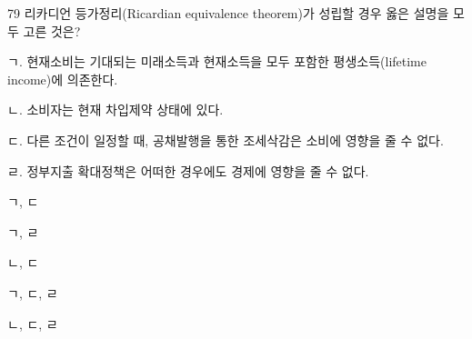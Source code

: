 \begin{question}{79}
리카디언 등가정리(Ricardian equivalence theorem)가 성립할 경우 옳은 설명을 모두 고른 것은?
\begin{framedtext}
ㄱ. 현재소비는 기대되는 미래소득과 현재소득을 모두 포함한 평생소득(lifetime income)에 의존한다. \par
ㄴ. 소비자는 현재 차입제약 상태에 있다. \par
ㄷ. 다른 조건이 일정할 때, 공채발행을 통한 조세삭감은 소비에 영향을 줄 수 없다. \par
ㄹ. 정부지출 확대정책은 어떠한 경우에도 경제에 영향을 줄 수 없다.
\end{framedtext}
\begin{choices}
  \item ㄱ, ㄷ
  \item ㄱ, ㄹ
  \item ㄴ, ㄷ
  \item ㄱ, ㄷ, ㄹ
  \item ㄴ, ㄷ, ㄹ
\end{choices}
\end{question}
